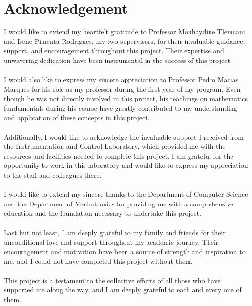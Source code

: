\documentclass{report}
\begin{document}
\tableofcontents
\break
\section*{Acknowledgement}
I would like to extend my heartfelt gratitude to Professor Mouhaydine Tlemcani and Irene Pimenta Rodrigues, my two supervisors, for their invaluable guidance, support, and encouragement throughout this project. Their expertise and unwavering dedication have been instrumental in the success of this project.\\
\\
I would also like to express my sincere appreciation to Professor Pedro Macias Marques for his role as my professor during the first year of my program. Even though he was not directly involved in this project, his teachings on mathematics fundamentals during his course have greatly contributed to my understanding and application of these concepts in this project.\\
\\
Additionally, I would like to acknowledge the invaluable support I received from the Instrumentation and Control Laboratory, which provided me with the resources and facilities needed to complete this project. I am grateful for the opportunity to work in this laboratory and would like to express my appreciation to the staff and colleagues there.\\
\\
I would like to extend my sincere thanks to the Department of Computer Science and the Department of Mechatronics for providing me with a comprehensive education and the foundation necessary to undertake this project.\\
\\
Last but not least, I am deeply grateful to my family and friends for their unconditional love and support throughout my academic journey. Their encouragement and motivation have been a source of strength and inspiration to me, and I could not have completed this project without them.\\
\\
This project is a testament to the collective efforts of all those who have supported me along the way, and I am deeply grateful to each and every one of them.
\end{document}
